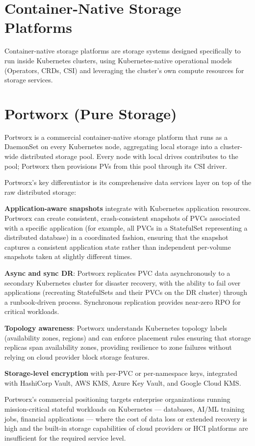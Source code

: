 \section{Container-Native Storage Platforms}
Container-native storage platforms are storage systems designed specifically to run inside Kubernetes clusters, using Kubernetes-native operational models (Operators, CRDs, CSI) and leveraging the cluster's own compute resources for storage services.

\section{Portworx (Pure Storage)}
Portworx is a commercial container-native storage platform that runs as a DaemonSet on every Kubernetes node, aggregating local storage into a cluster-wide distributed storage pool. Every node with local drives contributes to the pool; Portworx then provisions PVs from this pool through its CSI driver.

Portworx's key differentiator is its comprehensive data services layer on top of the raw distributed storage:

\textbf{Application-aware snapshots} integrate with Kubernetes application resources. Portworx can create consistent, crash-consistent snapshots of PVCs associated with a specific application (for example, all PVCs in a StatefulSet representing a distributed database) in a coordinated fashion, ensuring that the snapshot captures a consistent application state rather than independent per-volume snapshots taken at slightly different times.

\textbf{Async and sync DR}: Portworx replicates PVC data asynchronously to a secondary Kubernetes cluster for disaster recovery, with the ability to fail over applications (recreating StatefulSets and their PVCs on the DR cluster) through a runbook-driven process. Synchronous replication provides near-zero RPO for critical workloads.

\textbf{Topology awareness}: Portworx understands Kubernetes topology labels (availability zones, regions) and can enforce placement rules ensuring that storage replicas span availability zones, providing resilience to zone failures without relying on cloud provider block storage features.

\textbf{Storage-level encryption} with per-PVC or per-namespace keys, integrated with HashiCorp Vault, AWS KMS, Azure Key Vault, and Google Cloud KMS.

Portworx's commercial positioning targets enterprise organizations running mission-critical stateful workloads on Kubernetes --- databases, AI/ML training jobs, financial applications --- where the cost of data loss or extended recovery is high and the built-in storage capabilities of cloud providers or HCI platforms are insufficient for the required service level.

